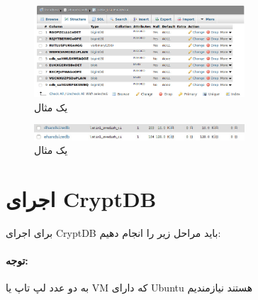 \documentclass[a4paper]{article}
\begin{document}
			\begin{figure}[h]
				\centering
				\includegraphics[width=0.7\textwidth]{im5.jpg}
				\caption{یک مثال}
			\end{figure}
		
		\begin{figure}[h]
			\centering
			\includegraphics[width=0.7\textwidth]{im6.jpg}
			\caption{یک مثال}
		\end{figure}
			
			\section{اجرای CryptDB}
			برای اجرای 
			CryptDB
			باید مراحل زیر را انجام دهیم:\\
			\paragraph{توجه:}
			به دو عدد لپ تاپ یا VM که دارای Ubuntu هستند نیازمندیم
			
\end{document}
